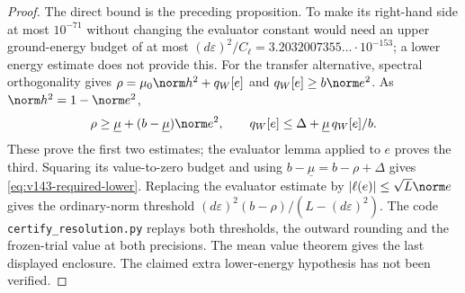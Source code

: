 \begin{proof}
The direct bound is the preceding proposition. To make its right-hand
side at most $10^{-71}$ without changing the evaluator constant would
need an upper ground-energy budget of at most
$(d\varepsilon)^2/C_\ell=3.2032007355\ldots\cdot10^{-153}$;
a lower energy estimate does not provide this.
For the transfer alternative, spectral orthogonality gives
$\rho=\mu_0\norm h^2+q_W[e]$ and $q_W[e]\ge b\norm e^2$.
As $\norm h^2=1-\norm e^2$,
\[
 \rho\ge\underline\mu+(b-\underline\mu)\norm e^2,
 \qquad
 q_W[e]\le\Delta+\underline\mu\,q_W[e]/b.
\]
These prove the first two estimates; the evaluator lemma applied to $e$
proves the third. Squaring its value-to-zero budget and using
$b-\underline\mu=b-\rho+\Delta$ gives
\eqref{eq:v143-required-lower}. Replacing the evaluator estimate by
$|\ell(e)|\le\sqrt L\norm e$ gives the ordinary-norm threshold
$(d\varepsilon)^2(b-\rho)/(L-(d\varepsilon)^2)$.
The code \texttt{certify\_resolution.py} replays both thresholds,
the outward rounding and the frozen-trial value at both precisions.
The mean value theorem gives the last displayed enclosure. The
claimed extra lower-energy hypothesis has not been verified.
\end{proof}

